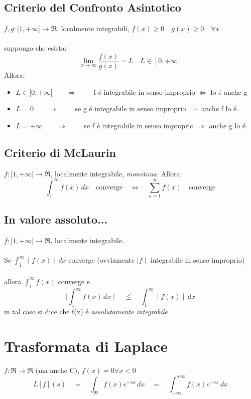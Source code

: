 \documentclass[a4paper,10pt,italian]{article}
\begin{document}
\subsection{Criterio del Confronto Asintotico}
$f,g:[1, +\infty[\rightarrow \Re$, localmente integrabili, $f(x) \geq 0\quad g(x) \geq 0 \quad \forall x$ \\ \\
suppongo che esista:
$$\lim_{x \rightarrow \infty} \frac{f(x)}{g(x)} = L \quad L\in[0, +\infty]  $$
Allora:
\begin{itemize}
\item $L \in ]0, +\infty[ \qquad \Rightarrow \qquad $ f \'e integrabile in senso improprio $\Leftrightarrow$ lo \'e anche g
\item $L = 0 \qquad \Rightarrow \qquad$ se g \'e integrabile in senso improprio $\Rightarrow$ anche f lo \'e.
\item $L = +\infty \qquad \Rightarrow \qquad$ se f \'e integrabile in senso improprio $\Rightarrow$ anche g lo \'e.
\end{itemize}

\subsection{Criterio di McLaurin}
$f:[1,+\infty[ \rightarrow \Re$, localmente integrabile, \emph{monotona}. Allora:
$$ \int_{1}^{\infty} f(x)\,dx \quad \mbox{converge} \quad \Longleftrightarrow\quad \sum_{n=1}^{\infty}f(x) \quad \mbox{converge} $$

\subsection{In valore assoluto...}
$f:[1,+\infty[ \rightarrow \Re$, localmente integrabile. \\ \\
Se $\int_{1}^{\infty}\mid f(x)\mid \,dx$ converge (ovviamente $\mid f \mid$ integrabile in senso improprio) \\ \\
allora $\int_{1}^{\infty}f(x)$ converge e
$$ \mid \int_{1}^{\infty} f(x)\,dx \mid \quad \leq \quad \int_{1}^{\infty} \mid f(x) \mid \,dx $$
in tal caso si dice che f(x) \'e \emph{assolutamente integrabile}

\section{Trasformata di Laplace}
$f:\Re \rightarrow \Re$ (ma anche C), $f(x)=0 \forall x < 0$
$$ L[f](s) \quad =\quad \int_{\Re} f(x) e^{-sx}\,dx \quad =\quad \int_{-\infty}^{+\infty}f(x)e^{-sx}\,dx $$
\end{document}
